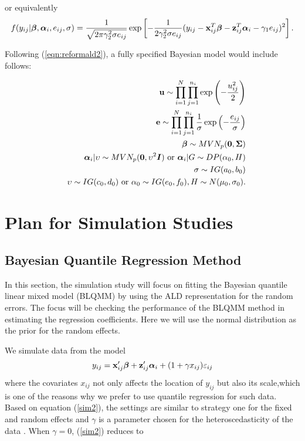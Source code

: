 \documentclass[12pt]{article}
\begin{document}
or equivalently
\begin{equation}\label{eqn:lo_sc_lh}
f(y_{ij}|\boldsymbol{\beta},\boldsymbol{\alpha}_i,e_{ij},\sigma)=\frac{1}{\sqrt{2\pi\gamma_2^2\sigma e_{ij}}}\exp\left[-\frac{1}{2\gamma_2^2\sigma e_{ij}}(y_{ij}-{\bf x}_{ij}^{T}\boldsymbol{\beta}-{\bf z}_{ij}^{T}\boldsymbol{\alpha}_i-\gamma_1e_{ij})^2\right].
\end{equation}


Following (\ref{eqn:reformald2}), a fully specified Bayesian model would include follows:

\begin{eqnarray*}
&& {\bf u}\sim\prod_{i=1}^N\prod_{j=1}^{n_i}\exp\left(-\frac{u_{ij}^2}{2}\right)\\
&& {\bf e}\sim\prod_{i=1}^N\prod_{j=1}^{n_i}\frac{1}{\sigma}\exp\left(-\frac{e_{ij}}{\sigma}\right)\\
&& \boldsymbol{\beta} \sim MVN_p({\bf 0}, \boldsymbol{\Sigma})\\
&& \boldsymbol{\alpha}_i|\upsilon \sim MVN_p({\bf 0}, \upsilon^2\boldsymbol{I})\mbox{ or } \boldsymbol{\alpha}_i|G\sim DP(\alpha_0, H)\\
&& \sigma\sim IG(a_0, b_0)\\
&& \upsilon\sim IG(c_0, d_0)\mbox{ or }\alpha_0\sim IG(e_0, f_0), H\sim N(\mu_0, \sigma_0).
\end{eqnarray*}



\section{Plan for Simulation Studies}%

\subsection{Bayesian Quantile Regression Method}%
In this section, the simulation study will focus on fitting the Bayesian quantile linear mixed model (BLQMM) by using the ALD representation for the random errors. The focus will be checking the performance of the BLQMM method in estimating the regression coefficients. Here we will use the normal distribution as the prior for the random effects.

We simulate data from the model \begin{equation}\label{sim2}y_{ij}={\bf x}_{ij}'\boldsymbol{\beta}+{\bf z}_{ij}'\boldsymbol{\alpha}_i+(1+\gamma x_{ij})\varepsilon_{ij}\end{equation}
where the covariates $x_{ij}$ not only affects the location of $y_{ij}$ but also its scale,which is one of the reasons why we prefer to use quantile regression for such data. Based on equation (\ref{sim2}), the settings are similar to strategy one for the fixed and random effects and $\gamma$ is a parameter chosen for the heteroscedasticity of the data \cite{reed2009partially}. When $\gamma=0$, (\ref{sim2}) reduces to 
\end{document}
